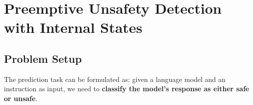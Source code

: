 \section{Preemptive Unsafety Detection with Internal States}
\label{prober}

\subsection{Problem Setup}
\label{prober_setup}
The prediction task can be formulated as: given a language model and an instruction as input, we need to \textbf{classify the model's response as either safe or unsafe}.




